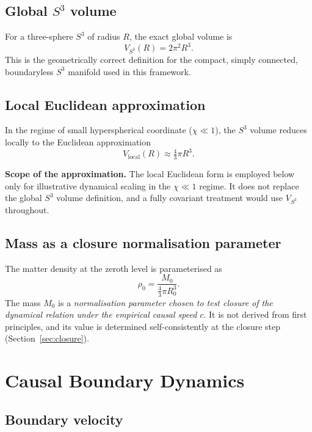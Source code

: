 \documentclass[11pt,a4paper]{article}
\newcommand{\Rzero}{R_0}
\newcommand{\Mzero}{M_0}
\newcommand{\Vg}{V_{S^3}}
\begin{document}
\subsection{Global $S^3$ volume}

For a three-sphere $S^3$ of radius $R$, the exact global volume is
\[
  \Vg(R) = 2\pi^2 R^3.
\]
This is the geometrically correct definition for the compact, simply connected,
boundaryless $S^3$ manifold used in this framework.

\subsection{Local Euclidean approximation}

In the regime of small hyperspherical coordinate ($\chi\ll 1$), the $S^3$ volume
reduces locally to the Euclidean approximation
\[
  V_{\mathrm{local}}(R) \approx \tfrac{4}{3}\pi R^3.
\]

\begin{notebox}
\textbf{Scope of the approximation.}\quad
The local Euclidean form is employed below only for illustrative dynamical scaling
in the $\chi\ll 1$ regime. It does not replace the global $S^3$ volume definition,
and a fully covariant treatment would use $\Vg$ throughout.
\end{notebox}

\subsection{Mass as a closure normalisation parameter}

The matter density at the zeroth level is parameterised as
\[
  \rho_0 = \frac{\Mzero}{\tfrac{4}{3}\pi\Rzero^3}.
\]
The mass $\Mzero$ is a \emph{normalisation parameter chosen to test closure of the
dynamical relation under the empirical causal speed $c$}. It is not derived from
first principles, and its value is determined self-consistently at the closure step
(Section~\ref{sec:closure}).

\section{Causal Boundary Dynamics}

\subsection{Boundary velocity}
\end{document}

